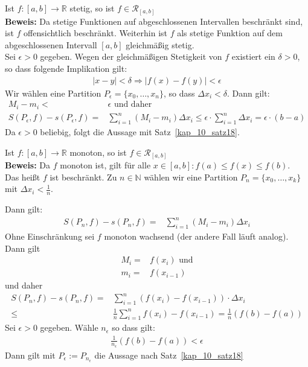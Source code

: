 \begin{Satz}{\label{kap10_satz20}
	Ist $f: [a,b] \rightarrow \mathbb{R}$ stetig, so ist 
	$ f \in \mathcal{R}_{[a,b]}$ \\
	\textbf{Beweis:} Da stetige Funktionen auf abgeschlossenen Intervallen 
	beschränkt sind, ist $f$ offensichtlich beschränkt. Weiterhin ist $f$ als stetige 
	Funktion auf dem abgeschlossenen Intervall $[a,b]$ gleichmäßig stetig. \\
	Sei $\epsilon > 0 $ gegeben. Wegen der gleichmäßigen Stetigkeit von $f$ 
	existiert ein $\delta > 0$, so dass folgende Implikation gilt:
	\begin{align*}
		\vert x - y \vert < \delta \Rightarrow \vert f(x) -f(y) \vert < \epsilon
	\end{align*}
	Wir wählen eine Partition $P_{\epsilon} = \{ x_0, \hdots, x_n \}$, so dass 
	$\Delta x_i < \delta$. Dann gilt:
	\begin{align*}
		M_i - m_i < & \epsilon \text{ und daher} \\
		S(P_{\epsilon},f) - s(P_{\epsilon},f) = & \sum_{i = 1}^n (M_i -m_i)\Delta x_i 
		\leq \epsilon \cdot \sum_{i = 1}^n \Delta x_i = \epsilon \cdot (b-a)
	\end{align*}
	Da $\epsilon > 0$ beliebig, folgt die Aussage mit Satz~\ref{kap_10_satz18}.
}\end{Satz}

\begin{Satz}{
		Ist $f: [a,b] \rightarrow \mathbb{R}$ monoton, so ist 
		$f \in \mathcal{R}_{[a,b]}$ \\
	\textbf{Beweis:} Da $f$ monoton ist, gilt für alle $x \in [a,b]: f(a) \leq f(x) 
	\leq f(b)$. \\
	Das heißt $f$ ist beschränkt. Zu $n \in \mathbb{N}$ wählen wir eine 
	Partition \linebreak $P_n = \{x_0, \hdots, x_k\}$ mit $\Delta x_i < \frac{1}{n}$.
	
	Dann gilt:
	\begin{align*}
		S(P_n, f) - s(P_n,f) = & \sum_{i=1}^n (M_i - m_i)\Delta x_i
	\end{align*}
	Ohne Einschränkung sei $f$ monoton wachsend (der andere Fall läuft analog).
	Dann gilt 
	\begin{align*}
		M_i = & f(x_i) \text{ und} \\
		m_i = & f(x_{i-1})
	\end{align*} und daher 
	\begin{align*}
		S(P_n, f) - s(P_n,f) = & \sum_{i=1}^n (f(x_i) -f(x_{i-1}))\cdot \Delta x_i 
		\\ \leq & \frac{1}{	n}\sum_{i=1}^n f(x_i) -f(x_{i-1}) = 
		\frac{1}{n} (f(b) -f(a)) 
	\end{align*}
	Sei $\epsilon > 0$ gegeben. Wähle $n_{\epsilon}$ so dass gilt:
	\begin{align*}
		\frac{1}{n_{\epsilon}}(f(b) -f(a)) < \epsilon
	\end{align*}
	Dann gilt mit $P_{\epsilon} := P_{n_{\epsilon}}$ die Aussage nach Satz~\ref{kap_10_satz18}
}\end{Satz}

